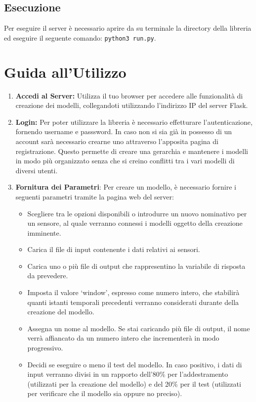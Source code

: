 \documentclass{rapportECL}
\begin{document}
\section*{Esecuzione}
Per eseguire il server è necessario aprire da su terminale la directory della libreria ed eseguire
il seguente comando: \texttt{python3 run.py}.



\chapter{Guida all'Utilizzo}
\begin{enumerate}
  \item \textbf{Accedi al Server:} Utilizza il tuo browser per accedere alle funzionalità di creazione dei modelli, 
  collegandoti utilizzando l'indirizzo IP del server Flask.

  \item \textbf{Login:} Per poter utilizzare la libreria è necessario effetturare l'autenticazione, fornendo username e passsword. In caso non si sia già in possesso
  di un account sarà necessario crearne uno attraverso l'apposita pagina di registrazione. Questo permette di creare una gerarchia e mantenere i modelli 
  in modo più organizzato senza che si creino conflitti tra i vari modelli di diversi utenti.

  \item \textbf{Fornitura dei Parametri}: Per creare un modello, è necessario fornire i seguenti parametri tramite la pagina web del server:
  \begin{itemize}
    \item Scegliere tra le opzioni disponibili o introdurre un nuovo nominativo per un sensore, al quale verranno connessi i modelli oggetto della creazione imminente.
    \item Carica il file di input contenente i dati relativi ai sensori.
    \item Carica uno o più file di output che rappresentino la variabile di risposta da prevedere.
    \item Imposta il valore `window', espresso come numero intero, che stabilirà quanti istanti temporali precedenti verranno considerati durante della creazione del modello.
    \item Assegna un nome al modello. Se stai caricando più file di output, il nome verrà affiancato da un numero intero che incrementerà in modo progressivo.
    \item Decidi se eseguire o meno il test del modello. In caso positivo, i dati di input verranno divisi in un rapporto dell'80\% per l'addestramento 
    (utilizzati per la creazione del modello) e del 20\% per il test (utilizzati per verificare che il modello sia oppure no preciso).
  \end{itemize}
  

\end{enumerate}
\end{document}
